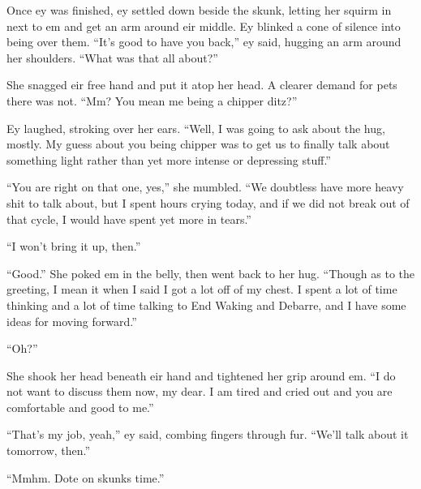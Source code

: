 Once ey was finished, ey settled down beside the skunk, letting her squirm in next to em and get an arm around eir middle. Ey blinked a cone of silence into being over them. ``It's good to have you back,'' ey said, hugging an arm around her shoulders. ``What was that all about?''

She snagged eir free hand and put it atop her head. A clearer demand for pets there was not. ``Mm? You mean me being a chipper ditz?''

Ey laughed, stroking over her ears. ``Well, I was going to ask about the hug, mostly. My guess about you being chipper was to get us to finally talk about something light rather than yet more intense or depressing stuff.''

``You are right on that one, yes,'' she mumbled. ``We doubtless have more heavy shit to talk about, but I spent hours crying today, and if we did not break out of that cycle, I would have spent yet more in tears.''

``I won't bring it up, then.''

``Good.'' She poked em in the belly, then went back to her hug. ``Though as to the greeting, I mean it when I said I got a lot off of my chest. I spent a lot of time thinking and a lot of time talking to End Waking and Debarre, and I have some ideas for moving forward.''

``Oh?''

She shook her head beneath eir hand and tightened her grip around em. ``I do not want to discuss them now, my dear. I am tired and cried out and you are comfortable and good to me.''

``That's my job, yeah,'' ey said, combing fingers through fur. ``We'll talk about it tomorrow, then.''

``Mmhm. Dote on skunks time.''
